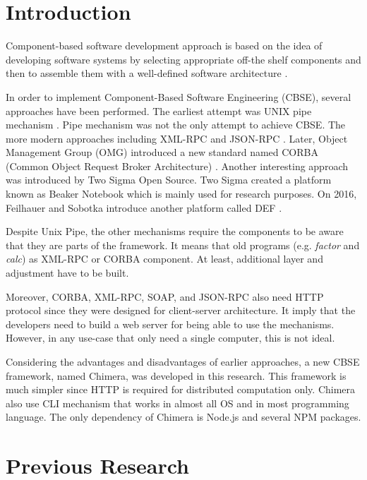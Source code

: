 \documentclass[conference]{IEEEtran}
\begin{document}
\IEEEpeerreviewmaketitle

\section{Introduction}

Component-based software development approach is based on the idea of developing 
software systems by selecting appropriate off-the shelf components and then to 
assemble them with a well-defined software architecture \cite{kaur2010component}.

In order to implement Component-Based Software Engineering (CBSE), several 
approaches have been performed. The earliest attempt was UNIX pipe mechanism 
\cite{mcilroy1968mass}. Pipe mechanism was not the only attempt to achieve CBSE.
The more modern approaches including XML-RPC \cite{xmlrpc} and JSON-RPC \cite{jsonrpc}. 
Later, Object Management Group (OMG) introduced a new standard named CORBA (Common
Object Request Broker Architecture) \cite{corba}. Another interesting approach was 
introduced by Two Sigma Open Source. Two Sigma created a platform known as Beaker
Notebook \cite{beakernotebook} which is mainly used for research purposes. 
On 2016, Feilhauer and Sobotka introduce another platform called DEF 
\cite{feilhauer2016def}.

Despite Unix Pipe, the other mechanisms require the components to be aware that 
they are parts of the framework. It means that old programs (e.g.
{\it factor} and {\it calc}) as XML-RPC or CORBA component. At least, additional layer
and adjustment have to be built.

Moreover, CORBA, XML-RPC, SOAP, and JSON-RPC also need HTTP protocol since they were designed for 
client-server architecture. It imply that the developers need to build a web server for being able 
to use the mechanisms. However, in any use-case that only need a single computer,
this is not ideal.

Considering the advantages and disadvantages of earlier approaches, a new CBSE framework, 
named Chimera, was developed in this research. This framework is much simpler since
HTTP is required for distributed computation only. Chimera also use CLI mechanism that
works in almost all OS and in most programming language.
The only dependency of Chimera is Node.js and several NPM packages.

\section{Previous Research}
\end{document}
